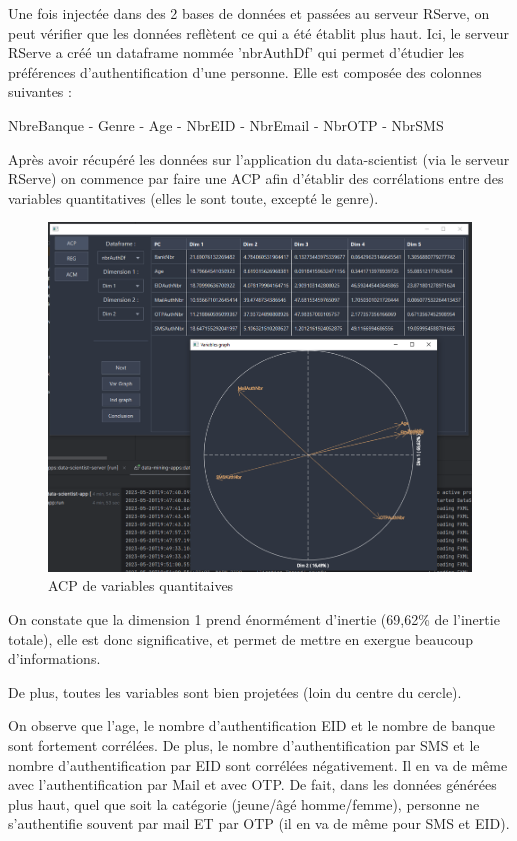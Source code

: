 Une fois injectée dans des 2 bases de données et passées au serveur RServe, on peut vérifier que les données reflètent ce qui a été établit plus haut. Ici, le serveur RServe a créé un dataframe nommée 'nbrAuthDf' qui permet d'étudier les préférences d'authentification d'une personne. Elle est composée des colonnes suivantes :

NbreBanque - Genre - Age - NbrEID - NbrEmail - NbrOTP - NbrSMS

Après avoir récupéré les données sur l'application du data-scientist (via le serveur RServe) on commence par faire une ACP afin d'établir des corrélations entre des variables quantitatives (elles le sont toute, excepté le genre).

\begin{figure}[H]
    \centering
    \includegraphics[width=\textwidth]{./img/thibault-Tests_Exemple_1.png}
    \caption{ACP de variables quantitaives}
    \label{fig:thibault-ex-01}
\end{figure}

On constate que la dimension 1 prend énormément d'inertie (69,62\% de l'inertie totale), elle est donc
significative, et permet de mettre en exergue beaucoup d'informations.

De plus, toutes les variables sont bien projetées (loin du centre du cercle).

On observe que l'age, le nombre d'authentification EID et le nombre de banque sont fortement
corrélées. De plus, le nombre d'authentification par SMS et le nombre d'authentification par EID sont
corrélées négativement. Il en va de même avec l'authentification par Mail et avec OTP. De fait, dans les
données générées plus haut, quel que soit la catégorie (jeune/âgé homme/femme), personne ne
s'authentifie souvent par mail ET par OTP (il en va de même pour SMS et EID).

